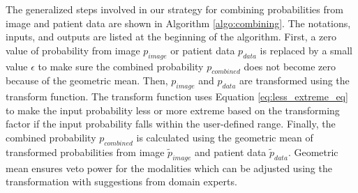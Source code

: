 The generalized steps involved in our strategy for combining probabilities from image and patient data are shown in Algorithm \ref{algo:combining}. The notations, inputs, and outputs are listed at the beginning of the algorithm. First, a zero value of probability from image $p_{image}$ or patient data $p_{data}$ is replaced by a small value $\epsilon$ to make sure the combined probability $p_{combined}$ does not become zero because of the geometric mean. Then, $p_{image}$ and  $p_{data}$ are transformed using the transform function. The transform function uses Equation \ref{eq:less_extreme_eq} to make the input probability less or more extreme based on the transforming factor if the input probability falls within the user-defined range. Finally, the combined probability $p_{combined}$ is calculated using the geometric mean of transformed probabilities from image $\tilde{p}_{image}$ and patient data $\tilde{p}_{data}$. Geometric mean ensures veto power for the modalities which can be adjusted using the transformation with suggestions from domain experts.
